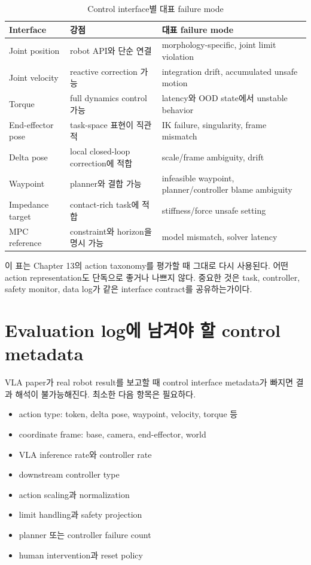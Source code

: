\begin{table}[ht]
\centering
\caption{Control interface별 대표 failure mode}
\label{tab:control-failure}
\small
\begin{tabularx}{\textwidth}{p{28mm}X X}
\toprule
Interface & 강점 & 대표 failure mode \\
\midrule
Joint position & robot API와 단순 연결 & morphology-specific, joint limit violation \\
Joint velocity & reactive correction 가능 & integration drift, accumulated unsafe motion \\
Torque & full dynamics control 가능 & latency와 OOD state에서 unstable behavior \\
End-effector pose & task-space 표현이 직관적 & IK failure, singularity, frame mismatch \\
Delta pose & local closed-loop correction에 적합 & scale/frame ambiguity, drift \\
Waypoint & planner와 결합 가능 & infeasible waypoint, planner/controller blame ambiguity \\
Impedance target & contact-rich task에 적합 & stiffness/force unsafe setting \\
MPC reference & constraint와 horizon을 명시 가능 & model mismatch, solver latency \\
\bottomrule
\end{tabularx}
\end{table}

이 표는 Chapter 13의 action taxonomy를 평가할 때 그대로 다시 사용된다. 어떤 action representation도 단독으로 좋거나 나쁘지 않다. 중요한 것은 task, controller, safety monitor, data log가 같은 interface contract를 공유하는가이다.

\section{Evaluation log에 남겨야 할 control metadata}

VLA paper가 real robot result를 보고할 때 control interface metadata가 빠지면 결과 해석이 불가능해진다. 최소한 다음 항목은 필요하다.

\begin{itemize}
  \item action type: token, delta pose, waypoint, velocity, torque 등
  \item coordinate frame: base, camera, end-effector, world
  \item VLA inference rate와 controller rate
  \item downstream controller type
  \item action scaling과 normalization
  \item limit handling과 safety projection
  \item planner 또는 controller failure count
  \item human intervention과 reset policy
\end{itemize}

